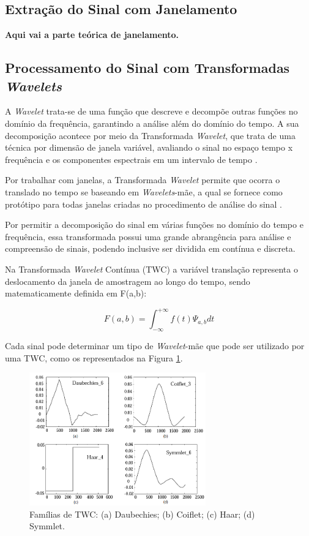 \documentclass[conference]{IEEEtran}
\begin{document}
\subsection{Extração do Sinal com Janelamento}

\textbf{Aqui vai a parte teórica de janelamento.}

\subsection{Processamento do Sinal com Transformadas \textit{Wavelets}}
A \textit{Wavelet} trata-se de uma função que descreve e decompõe outras funções no domínio da frequência, garantindo a análise além do domínio do tempo. A sua decomposição acontece por meio da Transformada \textit{Wavelet}, que trata de uma técnica por dimensão de janela variável, avaliando o sinal no espaço tempo x frequência e os componentes espectrais em um intervalo de tempo \cite{graps95}.

Por trabalhar com janelas, a Transformada \textit{Wavelet} permite que ocorra o translado no tempo se baseando em \textit{Wavelets}-mãe, a qual se fornece como protótipo para todas janelas criadas no procedimento de análise do sinal \cite{graps95}.

Por permitir a decomposição do sinal em várias funções no domínio do tempo e frequência, essa transformada possui uma grande abrangência para análise e compreensão de sinais, podendo inclusive ser dividida em contínua e discreta.

Na Transformada \textit{Wavelet} Contínua (TWC) a variável translação representa o deslocamento da janela de amostragem ao longo do tempo, sendo matematicamente definida em F(a,b):

\[ 	F(a,b) = \int^{+\infty}_{-\infty} f(t)\Psi_{a,b} dt \]

Cada sinal pode determinar um tipo de \textit{Wavelet}-mãe que pode ser utilizado por uma TWC, como os representados na Figura \ref{waveletContinuaFamilias}.

\begin{figure}[!h]
	\centering
	\includegraphics[width=3in]{img/waveletContinuaFamilias}
	\caption{Famílias de TWC: (a) Daubechies; (b) Coiflet; (c) Haar; (d) Symmlet.}
	\label{waveletContinuaFamilias}
\end{figure}
\end{document}
